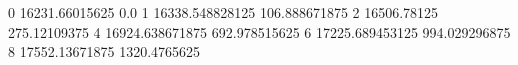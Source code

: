 0 16231.66015625 0.0
1 16338.548828125 106.888671875
2 16506.78125 275.12109375
4 16924.638671875 692.978515625
6 17225.689453125 994.029296875
8 17552.13671875 1320.4765625
